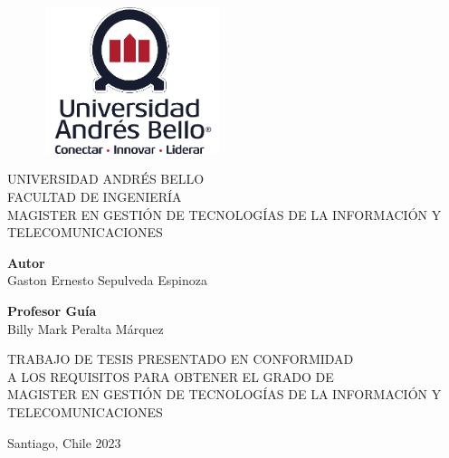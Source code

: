 \begin{titlepage}
    \begin{figure}[h]
        \centering
        \includegraphics[width=2.06111in,height=1.68611in]{img/image1.png}
    \end{figure}
    
    \begin{center}
        \fontsize{12}{14}\selectfont %
        \LARGE
        UNIVERSIDAD ANDRÉS BELLO \\
        FACULTAD DE INGENIERÍA \\
        MAGISTER EN GESTIÓN DE TECNOLOGÍAS DE LA INFORMACIÓN Y TELECOMUNICACIONES

        \vspace{1cm} %

        \Huge

        \vspace{1cm} %

        \fontsize{12}{14}\selectfont %
        \textbf{Autor}\\
        Gaston Ernesto Sepulveda Espinoza

        \vspace{0.5cm} %

        \textbf{Profesor Guía}\\
        Billy Mark Peralta Márquez

        \vspace{0.5cm} %

        \begin{flushright}
            TRABAJO DE TESIS PRESENTADO EN CONFORMIDAD \\
            A LOS REQUISITOS PARA OBTENER EL GRADO DE \\
            MAGISTER EN GESTIÓN DE TECNOLOGÍAS DE LA INFORMACIÓN Y TELECOMUNICACIONES
        \end{flushright}

        \vspace{1cm} %

        \Large
        Santiago, Chile 2023         

    \end{center}
\end{titlepage}
